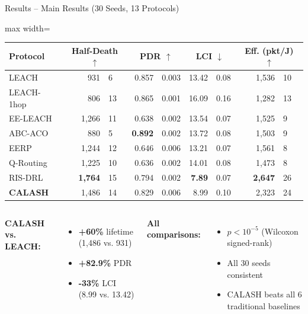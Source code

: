 \documentclass[aspectratio=169, 11pt]{beamer}
\begin{document}
\begin{frame}{Results -- Main Results (30 Seeds, 13 Protocols)}
\centering
\begin{adjustbox}{max width=\textwidth}
\footnotesize
\begin{tabular}{l r@{$\,\pm\,$}l r@{$\,\pm\,$}l r@{$\,\pm\,$}l r@{$\,\pm\,$}l}
\toprule
\textbf{Protocol} & \multicolumn{2}{c}{\textbf{Half-Death} $\uparrow$} & \multicolumn{2}{c}{\textbf{PDR} $\uparrow$} & \multicolumn{2}{c}{\textbf{LCI} $\downarrow$} & \multicolumn{2}{c}{\textbf{Eff. (pkt/J)} $\uparrow$} \\
\midrule
LEACH           & 931  & 6   & 0.857 & 0.003 & 13.42 & 0.08 & 1,536 & 10 \\
LEACH-1hop      & 806  & 13  & 0.865 & 0.001 & 16.09 & 0.16 & 1,282 & 13 \\
EE-LEACH        & 1,266 & 11 & 0.638 & 0.002 & 13.54 & 0.07 & 1,525 & 9 \\
ABC-ACO         & 880  & 5   & \textbf{0.892} & 0.002 & 13.72 & 0.08 & 1,503 & 9 \\
EERP            & 1,244 & 12 & 0.646 & 0.006 & 13.21 & 0.07 & 1,561 & 8 \\
Q-Routing       & 1,225 & 10 & 0.636 & 0.002 & 14.01 & 0.08 & 1,473 & 8 \\
\midrule
RIS-DRL         & \textbf{1,764} & 15 & 0.794 & 0.002 & \textbf{7.89} & 0.07 & \textbf{2,647} & 26 \\
\rowcolor{calash!10}
\textbf{CALASH} & 1,486 & 14 & 0.829 & 0.006 & 8.99 & 0.10 & 2,323 & 24 \\
\bottomrule
\end{tabular}
\end{adjustbox}

\vspace{4mm}
\begin{columns}[T]
\textbf{CALASH vs. LEACH:}
\begin{itemize}
    \item \textcolor{okgreen}{\textbf{+60\%}} lifetime (1,486 vs. 931)
    \item \textcolor{okgreen}{\textbf{+82.9\%}} PDR
    \item \textcolor{okgreen}{\textbf{-33\%}} LCI (8.99 vs. 13.42)
\end{itemize}
\textbf{All comparisons:}
\begin{itemize}
    \item $p < 10^{-5}$ (Wilcoxon signed-rank)
    \item All 30 seeds consistent
    \item CALASH beats all 6 traditional baselines
\end{itemize}
\end{columns}
\end{frame}
\end{document}

